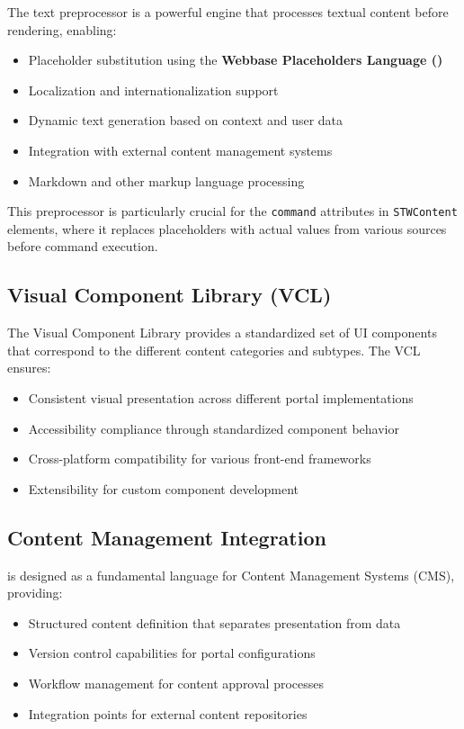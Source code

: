 The \wbdl{} text preprocessor is a powerful engine that processes textual content before rendering, enabling:

\begin{itemize}
\item Placeholder substitution using the \textbf{Webbase Placeholders Language (\wbpl{})}
\item Localization and internationalization support
\item Dynamic text generation based on context and user data
\item Integration with external content management systems
\item Markdown and other markup language processing
\end{itemize}

This preprocessor is particularly crucial for the \texttt{command} attributes in \texttt{STWContent} elements, where it replaces placeholders with actual values from various sources before command execution.

\subsection{Visual Component Library (VCL)}
\label{sec:vcl}

The Visual Component Library provides a standardized set of UI components that correspond to the different content categories and subtypes. The VCL ensures:

\begin{itemize}
\item Consistent visual presentation across different portal implementations
\item Accessibility compliance through standardized component behavior
\item Cross-platform compatibility for various front-end frameworks
\item Extensibility for custom component development
\end{itemize}

\subsection{Content Management Integration}
\label{sec:cms-integration}

\wbdl{} is designed as a fundamental language for Content Management Systems (CMS), providing:

\begin{itemize}
\item Structured content definition that separates presentation from data
\item Version control capabilities for portal configurations
\item Workflow management for content approval processes
\item Integration points for external content repositories
\end{itemize}

